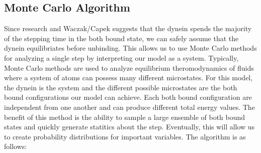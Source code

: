 \subsection{Monte Carlo Algorithm}
Since research and Waczak/Capek suggests that the dynein spends the majority of the stepping time in the both bound state, we can safely assume that the dynein equilibriates before unbinding. This allows us to use Monte Carlo methods for analyzing a single step by interpreting our model as a system. Typically, Monte Carlo methods are used to analyze equilibrium theromodynamics of fluids where a system of atoms can possess many different microstates. For this model, the dynein is the system and the different possible microstates are the both bound configurations our model can achieve. Each both bound configuration are independent from one another and can produce different total energy values. The benefit of this method is the ability to sample a large ensemble of both bound states and quickly generate statitics about the step. Eventually, this will allow us to create probability distributions for important variables. The algorithm is as follows:
